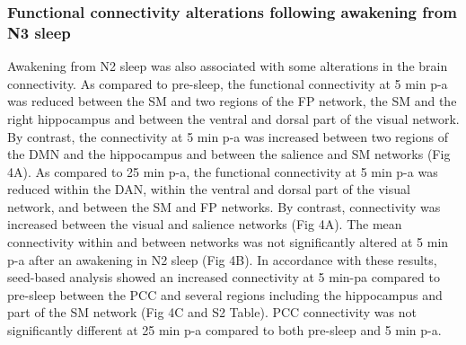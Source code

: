 \subsubsection*{Functional connectivity alterations following awakening from N3 sleep}
Awakening from N2 sleep was also associated with some alterations in the brain connectivity. As compared to pre-sleep, the functional connectivity at 5 min p-a was reduced between the SM and two regions of the FP network, the SM and the right hippocampus and between the ventral and dorsal part of the visual network. By contrast, the connectivity at 5 min p-a was increased between two regions of the DMN and the hippocampus and between the salience and SM networks (Fig 4A). As compared to 25 min p-a, the functional connectivity at 5 min p-a was reduced within the DAN, within the ventral and dorsal part of the visual network, and between the SM and FP networks. By contrast, connectivity was increased between the visual and salience networks (Fig 4A). The mean connectivity within and between networks was not significantly altered at 5 min p-a after an awakening in N2 sleep (Fig 4B). In accordance with these results, seed-based analysis showed an increased connectivity at 5 min-pa compared to pre-sleep between the PCC and several regions including the hippocampus and part of the SM network (Fig 4C and S2 Table). PCC connectivity was not significantly different at 25 min p-a compared to both pre-sleep and 5 min p-a.

